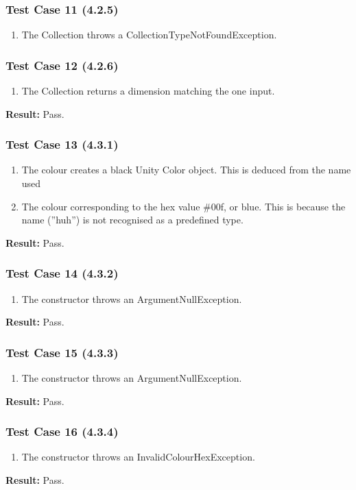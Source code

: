 \documentclass[a4paper,12pt]{article}
\begin{document}
		\subsubsection{Test Case 11 (4.2.5)}
				\begin{enumerate}
					\item The Collection throws a CollectionTypeNotFoundException.
				\end{enumerate}
		\subsubsection{Test Case 12 (4.2.6)}
				\begin{enumerate}
					\item The Collection returns a dimension matching the one input.
				\end{enumerate}
			\textbf{Result: }Pass.
		\subsubsection{Test Case 13 (4.3.1)}
				\begin{enumerate}
					\item The colour creates a black Unity Color object. This is deduced from the name used
					\item The colour corresponding to the hex value \#00f, or blue. This is because the name (”huh”) is not recognised as a predeﬁned type.
				\end{enumerate}
			\textbf{Result: }Pass.
		\subsubsection{Test Case 14 (4.3.2)}
				\begin{enumerate}
					\item The constructor throws an ArgumentNullException.
				\end{enumerate}
			\textbf{Result: }Pass.
		\subsubsection{Test Case 15 (4.3.3)}
				\begin{enumerate}
					\item The constructor throws an ArgumentNullException.
				\end{enumerate}
			\textbf{Result: }Pass.
		\subsubsection{Test Case 16 (4.3.4)}
				\begin{enumerate}
					\item The constructor throws an InvalidColourHexException.
				\end{enumerate}
			\textbf{Result: }Pass.
\end{document}
